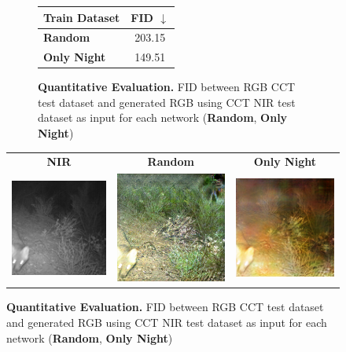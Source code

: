\documentclass[a4paper,11pt, DIV=12]{scrartcl}
\begin{document}
\begin{figure}[h]
   \centering
   \begin{subfigure}[h]{0.3\textwidth}
      \centering
      \begin{tabular}{l | c}
         Train Dataset       & FID $\downarrow$ \\
         \hline \hline
         \textbf{Random}     & 203.15           \\
         \textbf{Only Night} & 149.51
      \end{tabular}
      \caption{
         \textbf{Quantitative Evaluation.} FID between RGB CCT test dataset and generated RGB using CCT NIR test dataset as input for each network (\textbf{Random}, \textbf{Only Night})
      }
      \label{fig:hallucation-night-day-quan}
   \end{subfigure}
   \hfill
   \begin{subtable}[h]{0.65\textwidth}
      \centering
      \begin{tabular}{c c c}
         \textbf{NIR} \cite{caltech}                                                             & \textbf{Random} & \textbf{Only Night} \\

         \includegraphics[width=.3\textwidth]{img/586ae0f6-23d2-11e8-a6a3-ec086b02610b_real.png} &
         \includegraphics[width=.3\textwidth]{img/586ae0f6-23d2-11e8-a6a3-ec086b02610b_hal.png}  &
         \includegraphics[width=.3\textwidth]{img/586ae0f6-23d2-11e8-a6a3-ec086b02610b_without_hal.png}                                  \\


\end{tabular}
\end{subtable}
\end{figure}
\end{document}
